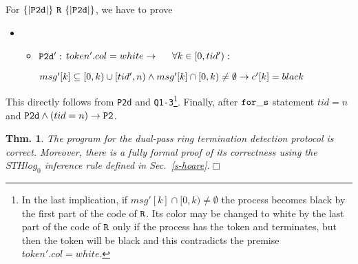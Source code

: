\documentclass[runningheads]{llncs}
\newcommand{\1}{\u{a}}
\newcommand{\2}{\c{s}}
\newcommand{\5}{\c{t}}
\newcommand{\8}{\^{\i}}
\newcommand{\9}{\^{a}}
\newtheorem{theorem}{Theorem}[section]
\newtheorem{theorem}{Thm.}[section]
\newcommand{\bthm}{\begin{theorem}}
\newcommand{\ethm}{\end{theorem}}
\newcommand{\bi}{\begin{itemize}}
\newcommand{\ei}{\end{itemize}}
\newcommand{\foo}[1]{\footnote{#1}}
\newcommand{\ra}{\rightarrow}
\newcommand{\co}{\,\colon\;}
\begin{document}
For $\{|{\tt P2d}|\}{\tt\ R\ }\{|{\tt P2d}|\}$, we have to prove \bi\item[]\bi
\item[${\tt P2d':}$] $token'.col=white\ra\\ \hspace*{.5cm}\forall k\in [0,tid')\co $\parbox[t]{8cm}{
$msg'[k]\subseteq [0,k)\cup[tid',n) \wedge \\ msg'[k]\cap[0,k)\not=\emptyset\ra c'[k]=black$}\ei\ei 
This directly follows from {\tt P2d} and {\tt Q1-3}\foo{In the last implication, if
$msg'[k]\cap[0,k)\not=\emptyset$ the process becomes black by the first part of the code of ${\tt R}$. Its
color may be changed to white by the last part of the code of ${\tt R}$ only if the process has the token and
terminates, but then the token will be black and this contradicts the premise $token'.col=white$.}. Finally,
after ${\tt for\_s}$ statement $tid=n$ and ${\tt P2d}\wedge (tid=n)\ra {\tt P2}$.

\bthm The program for the dual-pass ring termination detection protocol is correct. Moreover, there is a fully
formal proof of its correctness using the $STHlog_0$ inference rule defined in
Sec.~\ref{s-hoare}.\hfill{$\Box$}\ethm
\end{document}

